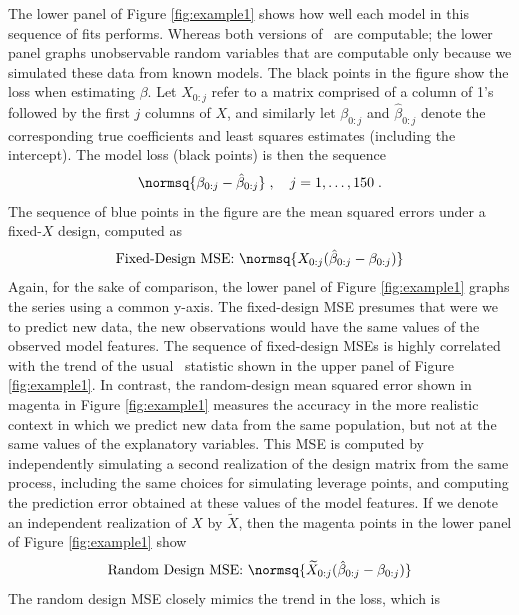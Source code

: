 \documentclass[12pt]{article}
\begin{document}
 The lower panel of Figure \ref{fig:example1} shows how well each model in this
 sequence of fits performs.  Whereas both versions of \aic\ are computable; the
 lower panel graphs unobservable random variables that are computable only
 because we simulated these data from known models.  The black points in the
 figure show the loss when estimating $\beta$.  Let $X_{0:j}$ refer to a matrix
 comprised of a column of 1's followed by the first $j$ columns of $X$, and
 similarly let $\beta_{0:j}$ and $\hat\beta_{0:j}$ denote the corresponding true
 coefficients and least squares estimates (including the intercept).  The model
 loss (black points) is then the sequence
 \begin{equation}
    \normsq{ \beta_{0:j} - \hat\beta_{0:j}} \;, \quad j = 1,\ldots,150 \;.
 \label{eq:loss}
 \end{equation}
 The sequence of blue points in the figure are the mean squared errors under a
 fixed-$X$ design, computed as
 \begin{equation}
    \mbox{Fixed-Design MSE:  } \normsq{ X_{0:j}(\hat\beta_{0:j}-\beta_{0:j}) }   
 \label{eq:fixed}
 \end{equation} 
 Again, for the sake of comparison, the lower panel of Figure \ref{fig:example1}
 graphs the series using a common y-axis.  The fixed-design MSE presumes that
 were we to predict new data, the new observations would have the same values of
 the observed model features.  The sequence of fixed-design MSEs is highly
 correlated with the trend of the usual \aic\ statistic shown in the upper panel
 of Figure \ref{fig:example1}.  In contrast, the random-design mean squared
 error shown in magenta in Figure \ref{fig:example1} measures the accuracy in
 the more realistic context in which we predict new data from the same
 population, but not at the same values of the explanatory variables.  This MSE
 is computed by independently simulating a second realization of the design
 matrix from the same process, including the same choices for simulating
 leverage points, and computing the prediction error obtained at these values of
 the model features.  If we denote an independent realization of $X$ by
 $\widetilde{X}$, then the magenta points in the lower panel of Figure
 \ref{fig:example1} show
 \begin{equation}
    \mbox{Random Design MSE:  } 
    \normsq{ \widetilde{X}_{0:j}(\hat\beta_{0:j}-\beta_{0:j}) }   
 \label{eq:random}
 \end{equation} 
 The random design MSE closely mimics the trend in the loss, which is
\end{document}
